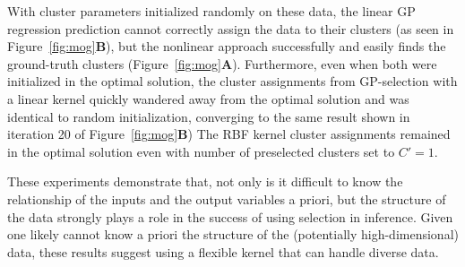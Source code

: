 With cluster parameters initialized randomly on these data, the linear GP regression prediction cannot correctly assign the data to their clusters (as seen in Figure~\ref{fig:mog}\textbf{B}), but the nonlinear approach successfully and easily finds the ground-truth clusters (Figure~\ref{fig:mog}\textbf{A}).
Furthermore, even when both were initialized in the optimal solution, the cluster assignments from GP-selection with a linear kernel quickly wandered away from the optimal solution and was identical to random initialization, converging to the same result shown in iteration 20 of Figure~\ref{fig:mog}\textbf{B})
The RBF kernel cluster assignments remained in the optimal solution even with number of preselected clusters set to $C'=1$.


These experiments demonstrate that, not only is it difficult to know the relationship of the inputs and the output variables a priori,
but the structure of the data strongly plays a role in the success of using selection in inference.
Given one likely cannot know a priori the structure of the (potentially high-dimensional) data, these results suggest using a flexible kernel that can handle diverse data.


%


